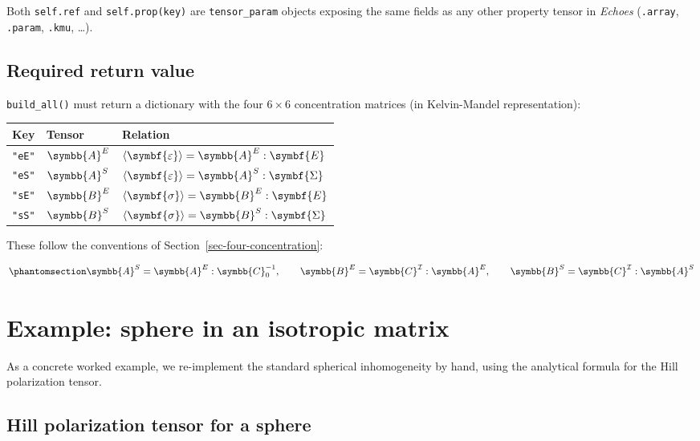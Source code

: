 \documentclass[
  a4paper,
  numbers=noendperiod,
  DIV=12]{scrreprt}
\newcounter{none} %
\newcommand{\uu}[1]{{\symbf{{#1}}}}
\newcommand{\uuuu}[1]{{\symbb{{#1}}}}
\newcommand{\eps}{{\uu{{\varepsilon}}}}
\newcommand{\E}{{\uu{{E}}}}
\newcommand{\sig}{{\uu{{\sigma}}}}
\newcommand{\Sig}{{\uu{{\Sigma}}}}
\begin{document}
Both \texttt{self.ref} and \texttt{self.prop(key)} are
\texttt{tensor\_param} objects exposing the same fields as any other
property tensor in \emph{Echoes} (\texttt{.array}, \texttt{.param},
\texttt{.kmu}, \ldots).

\subsection{Required return value}\label{required-return-value}

\texttt{build\_all()} must return a dictionary with the four
\(6\times6\) concentration matrices (in Kelvin-Mandel representation):

{\def\LTcaptype{none} %
\begin{longtable}[]{@{}lll@{}}
\toprule\noalign{}
Key & Tensor & Relation \\
\midrule\noalign{}
\endhead
\bottomrule\noalign{}
\endlastfoot
\texttt{"eE"} & \(\uuuu{A}^E\) &
\(\langle\eps\rangle = \uuuu{A}^E:\E\) \\
\texttt{"eS"} & \(\uuuu{A}^S\) &
\(\langle\eps\rangle = \uuuu{A}^S:\Sig\) \\
\texttt{"sE"} & \(\uuuu{B}^E\) &
\(\langle\sig\rangle = \uuuu{B}^E:\E\) \\
\texttt{"sS"} & \(\uuuu{B}^S\) &
\(\langle\sig\rangle = \uuuu{B}^S:\Sig\) \\
\end{longtable}
}

These follow the conventions of Section~\ref{sec-four-concentration}:

\begin{equation}\protect\phantomsection\label{eq-conc-relations}{
\uuuu{A}^S = \uuuu{A}^E:\uuuu{C}_0^{-1}, \qquad
\uuuu{B}^E = \uuuu{C}^\mathcal{I}:\uuuu{A}^E, \qquad
\uuuu{B}^S = \uuuu{C}^\mathcal{I}:\uuuu{A}^S
}\end{equation}

\section{Example: sphere in an isotropic matrix}\label{sec-user-sphere}

As a concrete worked example, we re-implement the standard spherical
inhomogeneity by hand, using the analytical formula for the Hill
polarization tensor.

\subsection{Hill polarization tensor for a
sphere}\label{hill-polarization-tensor-for-a-sphere}
\end{document}
